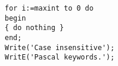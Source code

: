\documentclass{article}
\begin{document}
\lstset{language=Pascal}
\begin{lstlisting}
for i:=maxint to 0 do
begin
{ do nothing }
end;
Write('Case insensitive');
WritE('Pascal keywords.');
\end{lstlisting}
\end{document}
